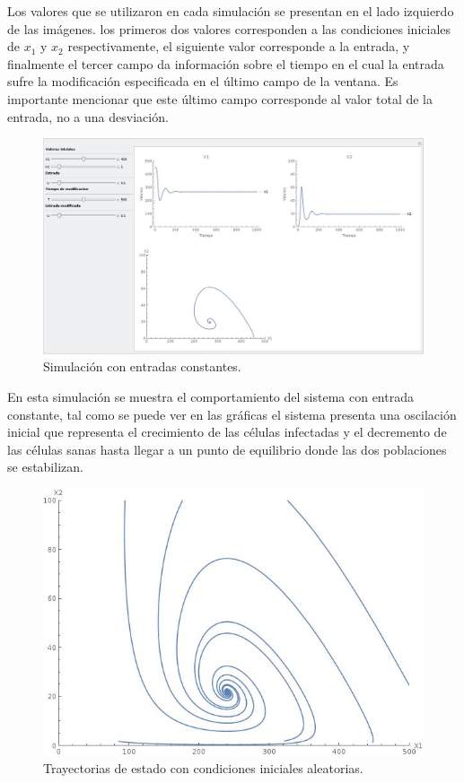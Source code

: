 \documentclass{article}
\begin{document}
Los valores que se utilizaron en cada simulación se presentan en el lado
izquierdo de las imágenes. los primeros dos valores corresponden a las
condiciones iniciales de $x_1$ y $x_2$ respectivamente, el siguiente valor
corresponde a la entrada, y finalmente el tercer campo da información sobre el
tiempo en el cual la entrada sufre la modificación especificada en el último
campo de la ventana. Es importante mencionar que este último campo corresponde al valor
total de la entrada, no a una desviación.

\newpage

\begin{figure}[H]
    \includegraphics[width=\textwidth]{Images/Vih-u-constante}
    \caption{Simulación con entradas constantes.}
\end{figure}

En esta simulación se muestra el comportamiento del sistema con entrada constante,
tal como se puede ver en las gráficas el sistema presenta una oscilación inicial
que representa el crecimiento de las células infectadas y el decremento de las
células sanas hasta llegar a un punto de equilibrio donde las dos poblaciones se
estabilizan.

\begin{figure}[H]
    \centering
    \includegraphics[scale=0.4]{Images/Vih-random}
    \caption{Trayectorias de estado con condiciones iniciales aleatorias.}
\end{figure}
\end{document}
